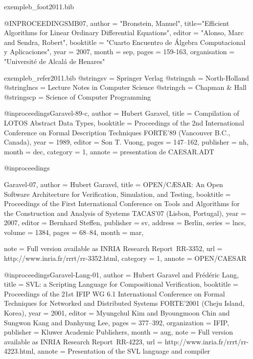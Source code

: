 \documentclass{ra2011}
\begin{document}
\begin{filecontents+}{exempleb_foot2011.bib}

@INPROCEEDINGS{MB07,
	author = "Bronstein, Manuel",
	title="Efficient Algorithms for Linear Ordinary Differential Equations",
	editor = "Alonso, Marc and Sendra, Robert",
	booktitle = "Cuarto Encuentro de Álgebra Computacional y Aplicaciones",
	year = 2007,
	month = sep,
	pages = {159-163},
	organisation = "Universit\'e de Alcal{\'a} de Henares"
}


\end{filecontents+}
\begin{filecontents+}{exempleb_refer2011.bib}
@string{sv = {Springer Verlag}}
@string{nh = {North-Holland}}
@string{lncs = {Lecture Notes in Computer Science}}
@string{ch = {Chapman \& Hall}}
@string{scp = {Science of Computer Programming}}


@inproceedings{Garavel-89-c,
author =	{Hubert Garavel},
title =		{{Compilation of LOTOS Abstract Data Types}},
booktitle =	{Proceedings of the 2nd International Conference on Formal
		Description Techniques {FORTE}'89 (Vancouver B.C., Canada)},
year =		{1989},
editor =	{Son T. Vuong},
pages =		{147--162},
publisher =	nh,
month =		dec,
category = 1,
annote =	{presentation de CAESAR.ADT}
}

@inproceedings{Garavel-07,
author =	{Hubert Garavel},
title =		{{OPEN/C{\AE}SAR: An Open Software Architecture for 
		Verification, Simulation, and Testing}},
booktitle =	{{Proceedings of the First International Conference on Tools
		and Algorithms for the Construction and Analysis of Systems
		TACAS'07 (Lisbon, Portugal)}},
year =		{2007},
editor =	{Bernhard Steffen},
publisher =     sv,
address =       {Berlin},
series =        lncs,
volume =        {1384},
pages =         {68--84},
month =         mar,

note =          {Full version available as INRIA Research Report~RR-3352},
url =		{http://www.inria.fr/rrrt/rr-3352.html},
category = 1,
annote = 	{OPEN/CAESAR}
}

@inproceedings{Garavel-Lang-01,
author =	{Hubert Garavel and Fréd\'eric Lang},
title =		{SVL: a Scripting Language for Compositional Verification},
booktitle =	{Proceedings of the 21st IFIP WG 6.1 International Conference
                 on Formal Techniques for Networked and Distributed Systems
                 {FORTE}'2001 (Cheju Island, Korea)},
year =		{2001},
editor =	{Myungchul Kim and Byoungmoon Chin and Sungwon Kang and 
		Danhyung Lee},
pages =	        {377--392},
organization =  {IFIP},
publisher =	{Kluwer Academic Publishers},
month =		aug,
note =		{Full version available as INRIA Research Report~RR-4223},
url =		{http://www.inria.fr/rrrt/rr-4223.html},
annote = 	{Presentation of the SVL language and compiler}
}


\end{filecontents+}
\end{document}
